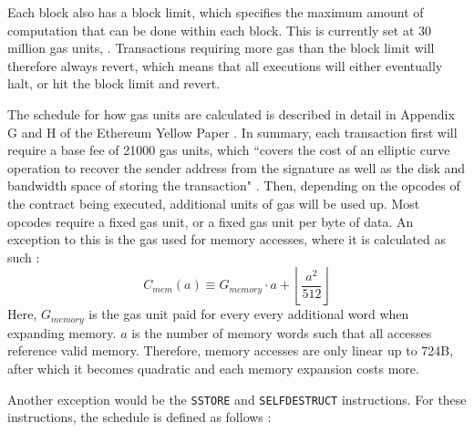 Each block also has a block limit, which specifies the maximum amount of computation
that can be done within each block. This is currently set at 30 million gas units,
\cite{ethgas}. Transactions requiring more 
gas than the block limit will therefore always revert, which means that all executions
will either eventually halt, or hit the block limit and revert.


The schedule for how gas units are calculated is described in detail in Appendix G and H of
the Ethereum Yellow Paper \cite{ethereumyellowpaper}. In summary, each transaction first will require
a base fee of 21000 gas units, which ``covers the cost of an elliptic curve operation to recover the 
sender address from the signature as well as the disk and bandwidth space of storing the transaction" 
\cite{ethdesignrationale}. Then, depending on the opcodes of the contract being executed, additional
units of gas will be used up. Most opcodes require a fixed gas unit, or a fixed gas unit per byte of data.
An exception to this is the gas used for memory accesses, where it is calculated as such \cite{ethereumyellowpaper}:
\[ C_{mem}(a) \equiv G_{memory} \cdot a + \left \lfloor{\frac{a^2}{512}}\right \rfloor \]
Here, $G_{memory}$ is the gas unit paid for every every additional word when expanding memory.
$a$ is the number of memory words such that all accesses reference valid memory. Therefore,
memory accesses are only linear up to 724B, after which it becomes quadratic and each memory
expansion costs more.

Another exception would be the \texttt{SSTORE} and \texttt{SELFDESTRUCT} instructions. For
these instructions, the schedule is defined as follows \cite{ethereumyellowpaper}:

